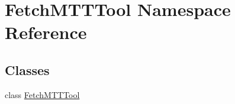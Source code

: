 \hypertarget{namespaceFetchMTTTool}{\section{Fetch\-M\-T\-T\-Tool Namespace Reference}
\label{namespaceFetchMTTTool}
}
\subsection*{Classes}
\begin{DoxyCompactItemize}
\item 
class \hyperlink{classFetchMTTTool_1_1FetchMTTTool}{Fetch\-M\-T\-T\-Tool}
\end{DoxyCompactItemize}
